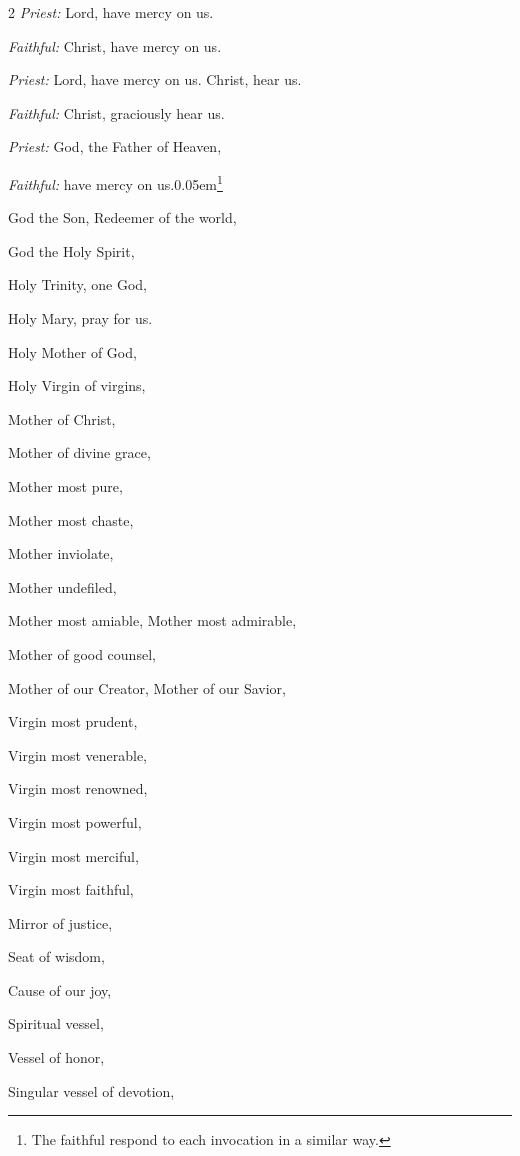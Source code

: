 \begin{enpars}
\begin{multicols}{2}
\raggedcolumns 
\textit{Priest:}  Lord, have mercy on us.

\textit{Faithful:} Christ, have mercy on us.

\textit{Priest:}  Lord, have mercy on us. Christ, hear us.

\textit{Faithful:} Christ, graciously hear us.

\textit{Priest:}  God, the Father of Heaven,

\textit{Faithful:} have mercy on us.\kern 0.05em\footnote{\raggedright{The faithful respond to each invocation in a similar way.}\par}

God the Son, Redeemer of the world,

God the Holy Spirit,

Holy Trinity, one God,

Holy Mary, pray for us.

Holy Mother of God,

Holy Virgin of virgins,

Mother of Christ,

Mother of divine grace,

Mother most pure,

Mother most chaste,

Mother inviolate,

Mother undefiled,

Mother most amiable,
Mother most admirable,

Mother of good counsel,

Mother of our Creator,
Mother of our Savior,

Virgin most prudent,

Virgin most venerable,

Virgin most renowned,

Virgin most powerful,

Virgin most merciful,

Virgin most faithful,

Mirror of justice,

Seat of wisdom,

Cause of our joy,

Spiritual vessel,

Vessel of honor,

Singular vessel of devotion,


\end{multicols}
\end{enpars}
